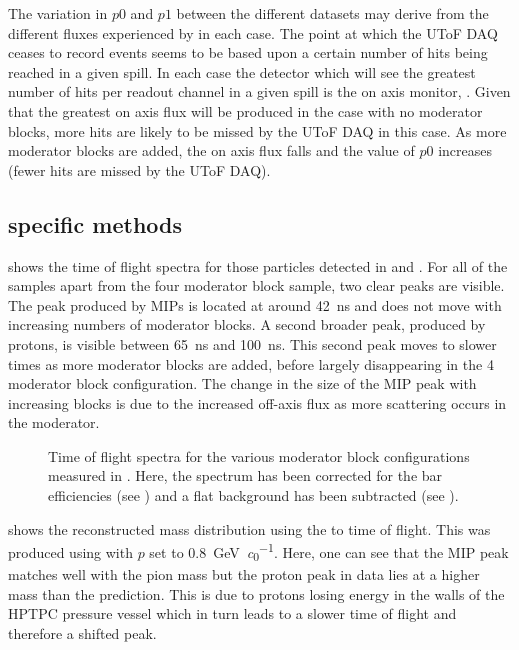 The variation in $p0$ and $p1$ between the different datasets may derive from the different fluxes experienced by \SOne in each case.
The point at which the UToF DAQ ceases to record events seems to be based upon a certain number of hits being reached in a given spill.
In each case the detector which will see the greatest number of hits per readout channel in a given spill is the on axis monitor, \SOne. 
Given that the greatest on axis flux will be produced in the case with no moderator blocks, more hits are likely to be missed by the UToF DAQ in this case.
As more moderator blocks are added, the on axis flux falls and the value of $p0$ increases (fewer hits are missed by the UToF DAQ).

  
\subsection{\SFour specific methods}
\label{sec:hptpc_beam_flux:methods:s4}

 shows the time of flight spectra for those particles detected in \STwo and \SFour.
For all of the samples apart from the four moderator block sample, two clear peaks are visible.
The peak produced by MIPs is located at around \SI{42}{\nano\second} and does not move with increasing numbers of moderator blocks.
A second broader peak, produced by protons, is visible between \SI{65}{\nano\second} and \SI{100}{\nano\second}.
This second peak moves to slower times as more moderator blocks are added, before largely disappearing in the 4 moderator block configuration.
The change in the size of the MIP peak with increasing blocks is due to the increased off-axis flux as more scattering occurs in the moderator.

\begin{figure}[h]
  \begin{adjustbox}{max totalsize=.9\textwidth, center}
    
  \end{adjustbox}
  \caption[Time of flight spectra measured in \SFour]{Time of flight spectra for the various moderator block configurations measured in \SFour. Here, the spectrum has been corrected for the bar efficiencies (see ) and a flat background has been subtracted (see ).}
  \label{fig:s4Tof}
\end{figure}

 shows the reconstructed mass distribution using the \STwo to \SFour time of flight.
This was produced using  with $p$ set to \SI{0.8}{\giga\electronvolt\per\clight}.
Here, one can see that the MIP peak matches well with the pion mass but the proton peak in data lies at a higher mass than the prediction.
This is due to protons losing energy in the walls of the HPTPC pressure vessel which in turn leads to a slower time of flight and therefore a shifted peak.

